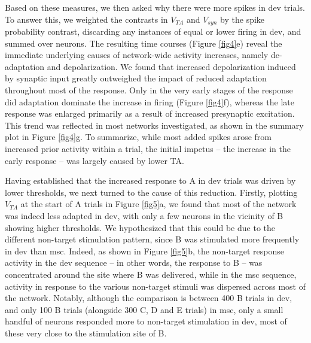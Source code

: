 \documentclass[pdflatex,referee,iicol,sn-basic]{sn-jnl}
\theoremstyle{thmstyleone}%
\theoremstyle{thmstyletwo}%
\theoremstyle{thmstylethree}%
\begin{document}
Based on these measures, we then asked why there were more spikes in dev trials. To answer this, we weighted the contrasts in $V_{TA}$ and $V_{syn}$ by the spike probability contrast, discarding any instances of equal or lower firing in dev, and summed over neurons. The resulting time courses (Figure \ref{fig4}e) reveal the immediate underlying causes of network-wide activity increases, namely de-adaptation and depolarization. We found that increased depolarization induced by synaptic input greatly outweighed the impact of reduced adaptation throughout most of the response. Only in the very early stages of the response did adaptation dominate the increase in firing (Figure \ref{fig4}f), whereas the late response was enlarged primarily as a result of increased presynaptic excitation. This trend was reflected in most networks investigated, as shown in the summary plot in Figure \ref{fig4}g. To summarize, while most added spikes arose from increased prior activity within a trial, the initial impetus -- the increase in the early response -- was largely caused by lower TA.

Having established that the increased response to A in dev trials was driven by lower thresholds, we next turned to the cause of this reduction. Firstly, plotting $V_{TA}$ at the start of A trials in Figure \ref{fig5}a, we found that most of the network was indeed less adapted in dev, with only a few neurons in the vicinity of B showing higher thresholds. We hypothesized that this could be due to the different non-target stimulation pattern, since B was stimulated more frequently in dev than msc. Indeed, as shown in Figure \ref{fig5}b, the non-target response activity in the dev sequence -- in other words, the response to B -- was concentrated around the site where B was delivered, while in the msc sequence, activity in response to the various non-target stimuli was dispersed across most of the network. Notably, although the comparison is between 400 B trials in dev, and only 100 B trials (alongside 300 C, D and E trials) in msc, only a small handful of neurons responded more to non-target stimulation in dev, most of these very close to the stimulation site of B.
\end{document}
